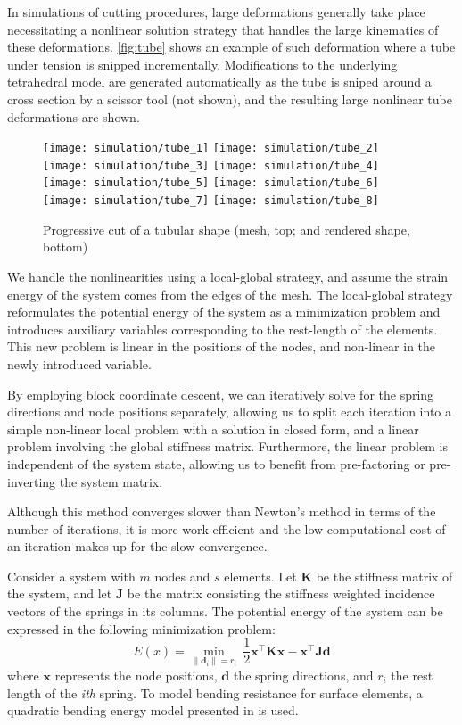 In simulations of cutting procedures, large deformations generally take place necessitating a nonlinear solution strategy that handles the large kinematics of these deformations. \autoref{fig:tube} shows an example of such deformation where a tube under tension is snipped incrementally. Modifications to the underlying tetrahedral model are generated automatically as the tube is sniped around a cross section by a scissor tool (not shown), and the resulting large nonlinear tube deformations are shown.

\begin{figure}
  \centering%
	\texttt{[image: simulation/tube\_1]}\hfill%
	\texttt{[image: simulation/tube\_2]}\hfill%
	\texttt{[image: simulation/tube\_3]}\hfill%
	\texttt{[image: simulation/tube\_4]}\\

  \centering%
	\texttt{[image: simulation/tube\_5]}\hfill%
	\texttt{[image: simulation/tube\_6]}\hfill%
	\texttt{[image: simulation/tube\_7]}\hfill%
	\texttt{[image: simulation/tube\_8]}\\
	\caption{Progressive cut of a tubular shape (mesh, top; and rendered shape, bottom)}
	\label{fig:tube}
\end{figure}

We handle the nonlinearities using a local-global strategy, and assume the strain energy of the system comes from the edges of the mesh. The local-global strategy reformulates the potential energy of the system as a minimization problem and introduces auxiliary variables corresponding to the rest-length of the elements. This new problem is linear in the positions of the nodes, and non-linear in the newly introduced variable.

By employing block coordinate descent, we can iteratively solve for the spring directions and node positions separately, allowing us to split each iteration into a simple non-linear local problem with a solution in closed form, and a linear problem involving the global stiffness matrix. Furthermore, the linear problem is independent of the system state, allowing us to benefit from pre-factoring or pre-inverting the system matrix.

Although this method converges slower than Newton's method in terms of the number of iterations, it is more work-efficient and the low computational cost of an iteration makes up for the slow convergence.

Consider a system with $m$ nodes and $s$ elements. Let $\mathbf{K}$ be the stiffness matrix of the system, and let $\mathbf{J}$ be the matrix consisting the stiffness weighted incidence vectors of the springs in its columns. The potential energy of the system can be expressed in the following minimization problem:
\begin{equation}
  E(x) = \min_{\|\mathbf{d}_i\| = r_i} \
  \frac{1}{2}\mathbf{x}^\intercal\mathbf{Kx} -
  \mathbf{x}^\intercal\mathbf{Jd}
\end{equation}
where $\mathbf{x}$ represents the node positions, $\mathbf{d}$ the spring directions, and $r_i$ the rest length of the \textit{ith} spring. To model bending resistance for surface elements, a quadratic bending energy model presented in \autocite{Bergou06} is used.

